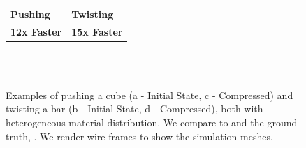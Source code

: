 \begin{figure}[t]
	\centering
	\begin{tabularx}{0.92\columnwidth}{ Y Y }
		\textbf{Pushing} & \textbf{Twisting} \\
		\textbf{12x Faster} & \textbf{15x Faster}
	\end{tabularx}\\
	\\
	\caption{Examples of pushing a cube (a - Initial State, c - Compressed) and twisting a bar (b - Initial State, d - Compressed), both with heterogeneous material distribution. We compare {\DDFEM} to {\Naive} and the  ground-truth, {\HiRes}. We render wire frames to show the simulation meshes.}
	\label{fig:accuracy}
\end{figure}
